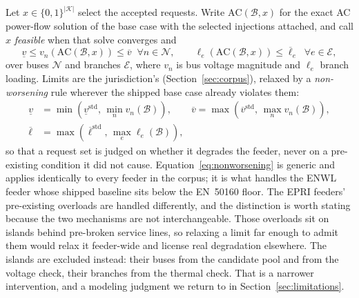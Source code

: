\documentclass[review,authoryear,12pt]{elsarticle}
\begin{document}
Let $x \in \{0,1\}^{|\mathcal{K}|}$ select the accepted requests. Write
$\mathrm{AC}(\mathcal{B}, x)$ for the exact AC power-flow solution of the base
case with the selected injections attached, and call $x$ \emph{feasible} when
that solve converges and
\begin{equation}
\underline{v} \le v_n\!\left(\mathrm{AC}(\mathcal{B},x)\right) \le \overline{v}
\;\; \forall n \in \mathcal{N},
\qquad
\ell_e\!\left(\mathrm{AC}(\mathcal{B},x)\right) \le \overline{\ell}_e
\;\; \forall e \in \mathcal{E},
\label{eq:feas}
\end{equation}
over buses $\mathcal{N}$ and branches $\mathcal{E}$, where $v_n$ is bus voltage
magnitude and $\ell_e$ branch loading. Limits are the jurisdiction's
(Section~\ref{sec:corpus}), relaxed by a \emph{non-worsening} rule wherever the
shipped base case already violates them:
\begin{equation}
\begin{aligned}
\underline{v} &= \min\!\left(\underline{v}^{\text{std}},\, \min_n v_n(\mathcal{B})\right), \qquad
\overline{v} = \max\!\left(\overline{v}^{\text{std}},\, \max_n v_n(\mathcal{B})\right), \\
\overline{\ell} &= \max\!\left(\overline{\ell}^{\text{std}},\, \max_e \ell_e(\mathcal{B})\right),
\end{aligned}
\label{eq:nonworsening}
\end{equation}
so that a request set is judged on whether it degrades the feeder, never on a
pre-existing condition it did not cause. Equation~\eqref{eq:nonworsening} is
generic and applies identically to every feeder in the corpus; it is what
handles the ENWL feeder whose shipped baseline sits below the EN~50160 floor.
The EPRI feeders' pre-existing overloads are handled differently, and the
distinction is worth stating because the two mechanisms are not
interchangeable. Those overloads sit on islands behind pre-broken service
lines, so relaxing a limit far enough to admit them would relax it feeder-wide
and license real degradation elsewhere. The islands are excluded instead: their
buses from the candidate pool and from the voltage check, their branches from
the thermal check. That is a narrower intervention, and a modeling judgment we
return to in Section~\ref{sec:limitations}.
\end{document}
